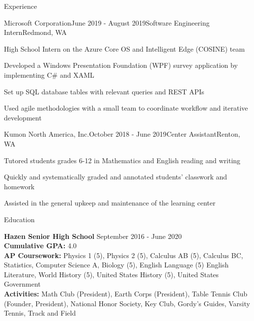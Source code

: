 \documentclass{resume} %
\begin{document}

\begin{rSection}{Experience}

\begin{rSubsection}{Microsoft Corporation}{June 2019 - August 2019}{Software Engineering Intern}{Redmond, WA}
\item High School Intern on the Azure Core OS and Intelligent Edge (COSINE) team
\item Developed a Windows Presentation Foundation (WPF) survey application by implementing C\# and XAML
\item Set up SQL database tables with relevant queries and REST APIs
\item Used agile methodologies with a small team to coordinate workflow and iterative development
\end{rSubsection}


\begin{rSubsection}{Kumon North America, Inc.}{October 2018 - June 2019}{Center Assistant}{Renton, WA}
\item Tutored students grades 6-12 in Mathematics and English reading and writing
\item Quickly and systematically graded and annotated students' classwork and homework
\item Assisted in the general upkeep and maintenance of the learning center
\end{rSubsection}

\end{rSection}


\begin{rSection}{Education}

{\bf Hazen Senior High School} \hfill {September 2016 - June 2020}\\
{\bf Cumulative GPA:} 4.0  \smallskip \\
{\bf AP Coursework:} Physics 1 (5), Physics 2 (5), Calculus AB (5), Calculus BC, Statistics, Computer Science A, Biology (5), English Language (5) English Literature, World History (5), United States History (5), United States Government \\
{\bf Activities:} Math Club (President), Earth Corps (President), Table Tennis Club (Founder, President), National Honor Society, Key Club, Gordy's Guides, Varsity Tennis, Track and Field



\end{rSection}
\end{document}
